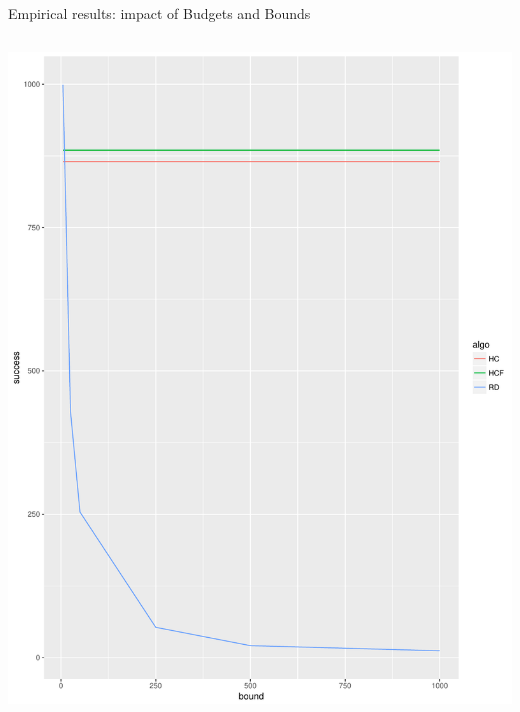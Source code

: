\documentclass{beamer}
\begin{document}
\begin{frame}{Empirical results: impact of Budgets and Bounds}
\begin{columns}
\begin{column}{0.5\textwidth}
\begin{center}
        \includegraphics[scale=0.25]{success_f_bound.pdf}
    \end{center}
\end{column}
\end{columns}
\end{frame}
\end{document}
